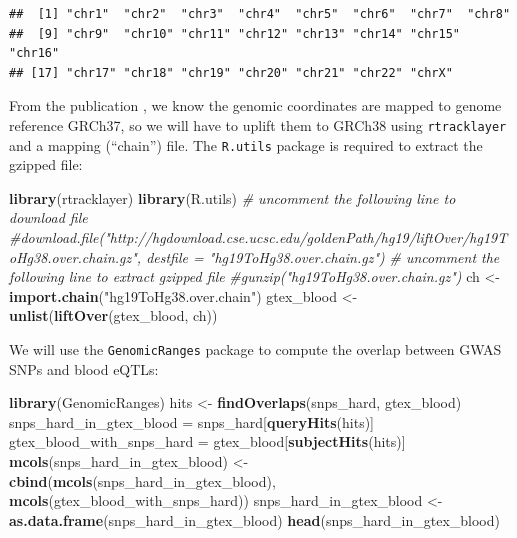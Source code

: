 \documentclass[9pt,a4paper,]{extarticle}
\newenvironment{Shaded}{\begin{snugshade}}{\end{snugshade}}
\newcommand{\KeywordTok}[1]{\textcolor[rgb]{0.13,0.29,0.53}{\textbf{#1}}}
\newcommand{\StringTok}[1]{\textcolor[rgb]{0.31,0.60,0.02}{#1}}
\newcommand{\CommentTok}[1]{\textcolor[rgb]{0.56,0.35,0.01}{\textit{#1}}}
\newcommand{\NormalTok}[1]{#1}
\begin{document}
\begin{verbatim}
##  [1] "chr1"  "chr2"  "chr3"  "chr4"  "chr5"  "chr6"  "chr7"  "chr8" 
##  [9] "chr9"  "chr10" "chr11" "chr12" "chr13" "chr14" "chr15" "chr16"
## [17] "chr17" "chr18" "chr19" "chr20" "chr21" "chr22" "chrX"
\end{verbatim}

From the publication \citep{GTEx2017a}, we know the genomic coordinates are mapped to genome reference GRCh37, so we will have to uplift them to GRCh38 using \texttt{rtracklayer} \citep{Lawrence2009} and a mapping (``chain'') file.
The \texttt{R.utils} package \citep{Bengtsson2017} is required to extract the gzipped file:

\begin{Shaded}
\begin{Highlighting}[]
\KeywordTok{library}\NormalTok{(rtracklayer)}
\KeywordTok{library}\NormalTok{(R.utils)}
\CommentTok{# uncomment the following line to download file}
\CommentTok{#download.file("http://hgdownload.cse.ucsc.edu/goldenPath/hg19/liftOver/hg19ToHg38.over.chain.gz", destfile = "hg19ToHg38.over.chain.gz")}
\CommentTok{# uncomment the following line to extract gzipped file}
\CommentTok{#gunzip("hg19ToHg38.over.chain.gz")}
\NormalTok{ch <-}\StringTok{ }\KeywordTok{import.chain}\NormalTok{(}\StringTok{"hg19ToHg38.over.chain"}\NormalTok{)}
\NormalTok{gtex_blood <-}\StringTok{ }\KeywordTok{unlist}\NormalTok{(}\KeywordTok{liftOver}\NormalTok{(gtex_blood, ch))}
\end{Highlighting}
\end{Shaded}

We will use the \texttt{GenomicRanges} package \citep{Lawrence2013} to compute the overlap between GWAS SNPs and blood eQTLs:

\begin{Shaded}
\begin{Highlighting}[]
\KeywordTok{library}\NormalTok{(GenomicRanges)}
\NormalTok{hits <-}\StringTok{ }\KeywordTok{findOverlaps}\NormalTok{(snps_hard, gtex_blood)}
\NormalTok{snps_hard_in_gtex_blood =}\StringTok{ }\NormalTok{snps_hard[}\KeywordTok{queryHits}\NormalTok{(hits)]}
\NormalTok{gtex_blood_with_snps_hard =}\StringTok{ }\NormalTok{gtex_blood[}\KeywordTok{subjectHits}\NormalTok{(hits)]}
\KeywordTok{mcols}\NormalTok{(snps_hard_in_gtex_blood) <-}\StringTok{ }\KeywordTok{cbind}\NormalTok{(}\KeywordTok{mcols}\NormalTok{(snps_hard_in_gtex_blood), }\KeywordTok{mcols}\NormalTok{(gtex_blood_with_snps_hard))}
\NormalTok{snps_hard_in_gtex_blood <-}\StringTok{ }\KeywordTok{as.data.frame}\NormalTok{(snps_hard_in_gtex_blood)}
\KeywordTok{head}\NormalTok{(snps_hard_in_gtex_blood)}
\end{Highlighting}
\end{Shaded}
\end{document}
